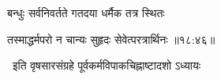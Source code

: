 \nemslokac

{\devanagarifontbold बन्धुः सर्वनिवर्तते गतदया धर्मैक तत्र स्थितः }%
  \dontdisplaylinenum

\nemslokad

{\devanagarifontbold तस्माद्धर्मपरो न चान्यः सुहृदः सेवेत्परत्रार्थिनः {॥१८:४६॥} \veg\dontdisplaylinenum }%
 
\vers


{\devanagarifontbold 
\jump
\begin{center}
\ketdanda\ इति वृषसारसंग्रहे पूर्वकर्मविपाकचिह्नाष्टादशो ऽध्यायः\ketdanda
\end{center}
\dontdisplaylinenum\vers  }%
